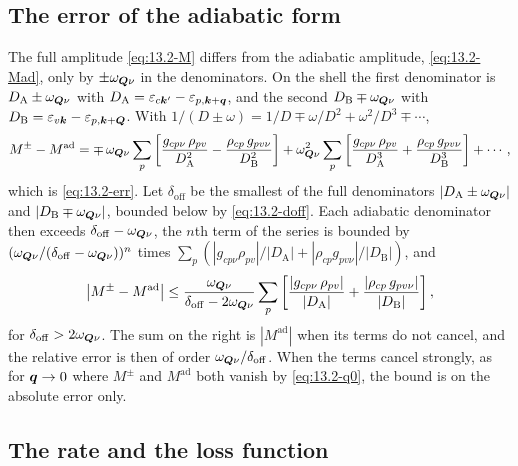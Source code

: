\subsection*{The error of the adiabatic form}

The full amplitude \cref{eq:13.2-M} differs from the adiabatic amplitude, \cref{eq:13.2-Mad}, only by $\pm\omega_{\bm{Q}\nu}$ in the denominators. On the shell the first denominator is $D_{\mathrm{A}} \pm \omega_{\bm{Q}\nu}$ with $D_{\mathrm{A}} = \varepsilon_{c\bm{k}'} - \varepsilon_{p,\bm{k}+\bm{q}}$, and the second $D_{\mathrm{B}} \mp \omega_{\bm{Q}\nu}$ with $D_{\mathrm{B}} = \varepsilon_{v\bm{k}} - \varepsilon_{p,\bm{k}+\bm{Q}}$. With $1/(D \pm \omega) = 1/D \mp \omega/D^2 + \omega^2/D^3 \mp \cdots$,
\begin{equation*}
  M^\pm - M^{\mathrm{ad}} = \mp\,\omega_{\bm{Q}\nu}\sum_p\left[\frac{g_{cp\nu}\,\rho_{pv}}{D_{\mathrm{A}}^2} - \frac{\rho_{cp}\,g_{pv\nu}}{D_{\mathrm{B}}^2}\right] + \omega_{\bm{Q}\nu}^2\sum_p\left[\frac{g_{cp\nu}\,\rho_{pv}}{D_{\mathrm{A}}^3} + \frac{\rho_{cp}\,g_{pv\nu}}{D_{\mathrm{B}}^3}\right] + \cdots ,
\end{equation*}
which is \cref{eq:13.2-err}. Let $\delta_{\mathrm{off}}$ be the smallest of the full denominators $|D_{\mathrm{A}} \pm \omega_{\bm{Q}\nu}|$ and $|D_{\mathrm{B}} \mp \omega_{\bm{Q}\nu}|$, bounded below by \cref{eq:13.2-doff}. Each adiabatic denominator then exceeds $\delta_{\mathrm{off}} - \omega_{\bm{Q}\nu}$, the $n$th term of the series is bounded by $(\omega_{\bm{Q}\nu}/(\delta_{\mathrm{off}} - \omega_{\bm{Q}\nu}))^n$ times $\sum_p(|g_{cp\nu}\rho_{pv}|/|D_{\mathrm{A}}| + |\rho_{cp}g_{pv\nu}|/|D_{\mathrm{B}}|)$, and
\begin{equation*}
  \bigl|M^\pm - M^{\mathrm{ad}}\bigr| \le \frac{\omega_{\bm{Q}\nu}}{\delta_{\mathrm{off}} - 2\omega_{\bm{Q}\nu}}\sum_p\left[\frac{|g_{cp\nu}\,\rho_{pv}|}{|D_{\mathrm{A}}|} + \frac{|\rho_{cp}\,g_{pv\nu}|}{|D_{\mathrm{B}}|}\right] ,
\end{equation*}
for $\delta_{\mathrm{off}} > 2\omega_{\bm{Q}\nu}$. The sum on the right is $|M^{\mathrm{ad}}|$ when its terms do not cancel, and the relative error is then of order $\omega_{\bm{Q}\nu}/\delta_{\mathrm{off}}$. When the terms cancel strongly, as for $\bm{q}\to0$ where $M^\pm$ and $M^{\mathrm{ad}}$ both vanish by \cref{eq:13.2-q0}, the bound is on the absolute error only.

\subsection*{The rate and the loss function}

